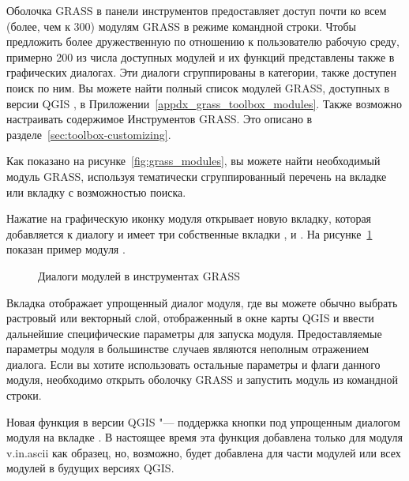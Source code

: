 Оболочка GRASS в панели инструментов предоставляет доступ почти ко всем
(более, чем к 300) модулям GRASS в режиме командной строки. Чтобы
предложить более дружественную по отношению к пользователю рабочую среду,
примерно 200 из числа доступных модулей и их функций представлены также
в графических диалогах. Эти диалоги сгруппированы в категории, также
доступен поиск по ним. Вы можете найти полный список модулей
GRASS, доступных в версии QGIS \CURRENT, в
Приложении~\ref{appdx_grass_toolbox_modules}. Также возможно настраивать
содержимое Инструментов GRASS. Это описано в
разделе~\ref{sec:toolbox-customizing}.

Как показано на рисунке~\ref{fig:grass_modules}, вы можете найти
необходимый модуль GRASS, используя тематически сгруппированный
перечень на вкладке  или вкладку 
с возможностью поиска.

Нажатие на графическую иконку модуля открывает новую вкладку, которая
добавляется к диалогу и имеет три собственные вкладки ,
 и . На рисунке~\ref{fig:grass_module_dialog}
показан пример модуля .

\begin{figure}[h]
\centering
   \hspace{1cm}
   \hspace{1cm}
\caption{Диалоги модулей в инструментах GRASS \wincaption}\label{fig:grass_module_dialog}
\end{figure}
\FloatBarrier
{}

Вкладка  отображает упрощенный диалог модуля, где вы
можете обычно выбрать растровый или векторный слой, отображенный в окне
карты QGIS и ввести дальнейшие специфические параметры для запуска
модуля. Предоставляемые параметры модуля в большинстве случаев являются
неполным отражением диалога. Если вы хотите использовать остальные
параметры и флаги данного модуля, необходимо открыть оболочку GRASS и
запустить модуль из командной строки.

Новая функция в версии QGIS \CURRENT "--- поддержка кнопки
 под упрощенным диалогом
модуля на вкладке . В настоящее время эта функция
добавлена только для модуля v.in.ascii как образец, но, возможно, будет
добавлена для части модулей или всех модулей в будущих версиях QGIS.

